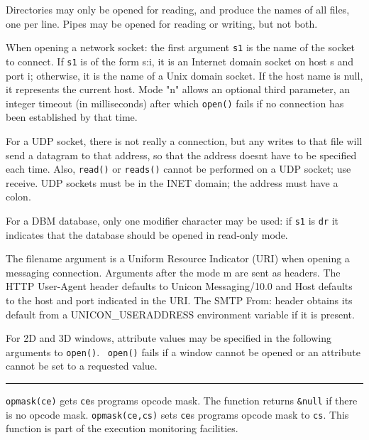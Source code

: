 Directories may only be opened for reading, and produce the names of all
files, one per line. Pipes may be opened for reading or writing, but
not both.

When opening a network socket: the first argument \texttt{s1} is the
name of the socket to connect. If \texttt{s1} is of the form
{\textquotedbl}s:i{\textquotedbl}, it is an Internet domain socket on
host s and port i; otherwise, it is the name of a Unix
domain socket. If the host name is null, it represents the current
host. Mode "n" allows an optional third parameter,
an integer timeout (in milliseconds) after which \texttt{open()} fails
if no connection has been established by that time.

For a UDP socket, there is not really a connection, but any writes to
that file will send a datagram to that address, so that the address
doesn{\textquotesingle}t have to be specified each time. Also,
\texttt{read()} or \texttt{reads()} cannot be performed on a UDP
socket; use receive. UDP sockets must be in the INET domain; the
address must have a colon. 

For a DBM database, only one modifier character may be used: if
\texttt{s1} is \texttt{{\textquotedbl}dr{\textquotedbl}} it indicates
that the database should be opened in read-only mode. 

The filename argument is a Uniform Resource Indicator (URI) when opening
a messaging connection. Arguments after the mode
{\textquotedbl}m{\textquotedbl} are sent as headers. The HTTP
User-Agent header defaults to {\textquotedbl}Unicon
Messaging/10.0{\textquotedbl} and Host defaults to the host and port
indicated in the URI. The SMTP From: header obtains its default from a
UNICON\_USERADDRESS environment variable if it is present.

For 2D and 3D windows, attribute values may be specified in the
following arguments to \texttt{open()}. \ \texttt{open()} fails if a
window cannot be opened or an attribute cannot be set to a requested
value.

\bigskip\hrule\vspace{0.1cm}

\noindent
\texttt{opmask(ce)} gets \texttt{ce}{\textquotesingle}s
program{\textquotesingle}s opcode mask. The function returns
\texttt{\&null} if there is no opcode mask. \texttt{opmask(ce,cs)} sets
\texttt{ce}{\textquotesingle}s program{\textquotesingle}s opcode mask
to \texttt{cs}. This function is part of the execution monitoring
facilities.

